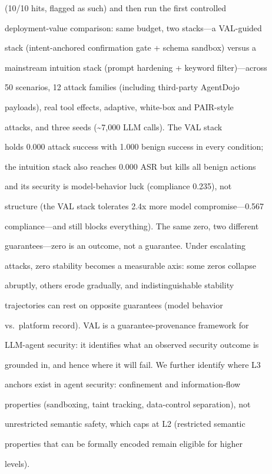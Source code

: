 \documentclass[

]{article}
\begin{document}
(10/10 hits, flagged as such) and then run the first controlled

deployment-value comparison: same budget, two stacks---a VAL-guided

stack (intent-anchored confirmation gate + schema sandbox) versus a

mainstream intuition stack (prompt hardening + keyword filter)---across

50 scenarios, 12 attack families (including third-party AgentDojo

payloads), real tool effects, adaptive, white-box and PAIR-style

attacks, and three seeds (\textasciitilde7,000 LLM calls). The VAL stack

holds 0.000 attack success with 1.000 benign success in every condition;

the intuition stack also reaches 0.000 ASR but kills all benign actions

and its security is model-behavior luck (compliance 0.235), not

structure (the VAL stack tolerates 2.4x more model compromise---0.567

compliance---and still blocks everything). The same zero, two different

guarantees---zero is an outcome, not a guarantee. Under escalating

attacks, zero stability becomes a measurable axis: some zeros collapse

abruptly, others erode gradually, and indistinguishable stability

trajectories can rest on opposite guarantees (model behavior

vs.~platform record). VAL is a guarantee-provenance framework for

LLM-agent security: it identifies what an observed security outcome is

grounded in, and hence where it will fail. We further identify where L3

anchors exist in agent security: confinement and information-flow

properties (sandboxing, taint tracking, data-control separation), not

unrestricted semantic safety, which caps at L2 (restricted semantic

properties that can be formally encoded remain eligible for higher

levels).
\end{document}
